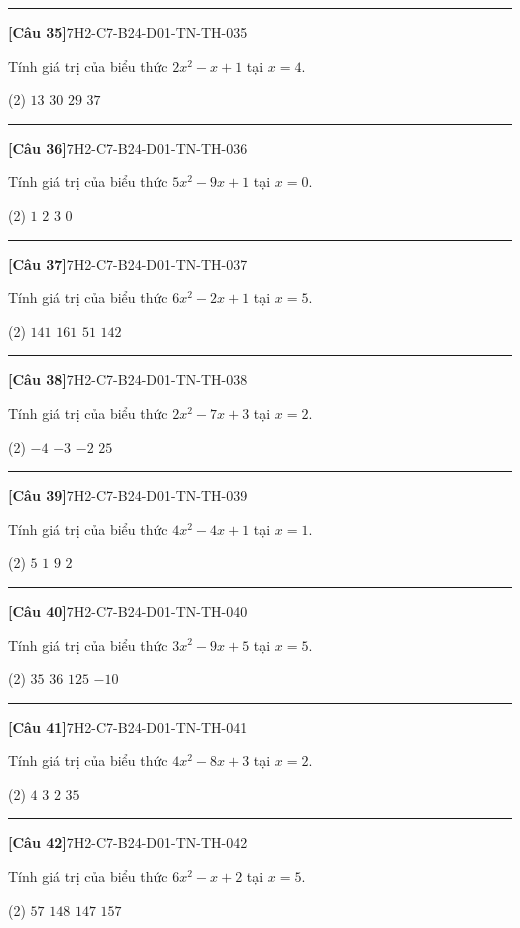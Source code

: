 \documentclass[12pt,a4paper]{article}
\newif\ifloigiai
\newenvironment{cauhoi}[2]{%
  \par\medskip\noindent\rule{\textwidth}{0.4pt}\par\nopagebreak
  \noindent\textbf{[#1]}\hfill{\scriptsize\ttfamily #2}\par\nopagebreak\smallskip}{\par}
\newcommand{\dapan}[1]{\ifloigiai\par\smallskip\noindent\textit{Đáp án:} \textbf{#1}\par\fi}
\begin{document}
\begin{cauhoi}{Câu 35}{7H2-C7-B24-D01-TN-TH-035}
Tính giá trị của biểu thức $2x^{2}-x+1$ tại $x=4$.
\begin{tasks}(2)
\task $13$
\task $30$
\task $29$
\task $37$
\end{tasks}
\dapan{C}
\end{cauhoi}
\begin{cauhoi}{Câu 36}{7H2-C7-B24-D01-TN-TH-036}
Tính giá trị của biểu thức $5x^{2}-9x+1$ tại $x=0$.
\begin{tasks}(2)
\task $1$
\task $2$
\task $3$
\task $0$
\end{tasks}
\dapan{A}
\end{cauhoi}
\begin{cauhoi}{Câu 37}{7H2-C7-B24-D01-TN-TH-037}
Tính giá trị của biểu thức $6x^{2}-2x+1$ tại $x=5$.
\begin{tasks}(2)
\task $141$
\task $161$
\task $51$
\task $142$
\end{tasks}
\dapan{A}
\end{cauhoi}
\begin{cauhoi}{Câu 38}{7H2-C7-B24-D01-TN-TH-038}
Tính giá trị của biểu thức $2x^{2}-7x+3$ tại $x=2$.
\begin{tasks}(2)
\task $-4$
\task $-3$
\task $-2$
\task $25$
\end{tasks}
\dapan{B}
\end{cauhoi}
\begin{cauhoi}{Câu 39}{7H2-C7-B24-D01-TN-TH-039}
Tính giá trị của biểu thức $4x^{2}-4x+1$ tại $x=1$.
\begin{tasks}(2)
\task $5$
\task $1$
\task $9$
\task $2$
\end{tasks}
\dapan{B}
\end{cauhoi}
\begin{cauhoi}{Câu 40}{7H2-C7-B24-D01-TN-TH-040}
Tính giá trị của biểu thức $3x^{2}-9x+5$ tại $x=5$.
\begin{tasks}(2)
\task $35$
\task $36$
\task $125$
\task $-10$
\end{tasks}
\dapan{A}
\end{cauhoi}
\begin{cauhoi}{Câu 41}{7H2-C7-B24-D01-TN-TH-041}
Tính giá trị của biểu thức $4x^{2}-8x+3$ tại $x=2$.
\begin{tasks}(2)
\task $4$
\task $3$
\task $2$
\task $35$
\end{tasks}
\dapan{B}
\end{cauhoi}
\begin{cauhoi}{Câu 42}{7H2-C7-B24-D01-TN-TH-042}
Tính giá trị của biểu thức $6x^{2}-x+2$ tại $x=5$.
\begin{tasks}(2)
\task $57$
\task $148$
\task $147$
\task $157$
\end{tasks}
\dapan{C}
\end{cauhoi}
\end{document}
